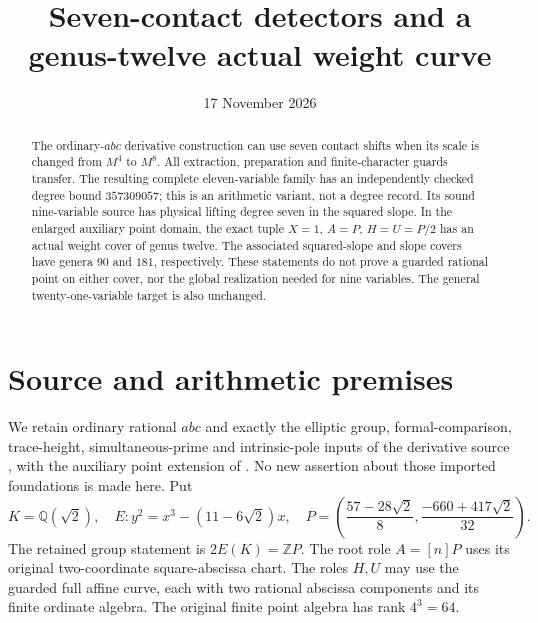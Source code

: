 \documentclass[11pt,a4paper]{article}
\title{Seven-contact detectors and a genus-twelve actual weight curve}
\author{}\date{17 November 2026}
\newcommand{\Q}{\mathbb Q}\newcommand{\Z}{\mathbb Z}
\begin{document}
\maketitle
\begin{abstract}
The ordinary-$abc$ derivative construction can use seven contact shifts
when its scale is changed from $M^4$ to $M^8$. All extraction, preparation
and finite-character guards transfer. The resulting complete eleven-variable
family has an independently checked degree bound $357309057$; this is an
arithmetic variant, not a degree record. Its sound nine-variable source has
physical lifting degree seven in the squared slope. In the enlarged auxiliary
point domain, the exact tuple $X=1$, $A=P$, $H=U=P/2$ has an actual weight
cover of genus twelve. The associated squared-slope and slope covers have
genera $90$ and $181$, respectively. These statements do not prove a guarded
rational point on either cover, nor the global realization needed for nine
variables. The general twenty-one-variable target is also unchanged.
\end{abstract}

\section{Source and arithmetic premises}
We retain ordinary rational $abc$ and exactly the elliptic group,
formal-comparison, trace-height, simultaneous-prime and intrinsic-pole
inputs of the derivative source \cite{Derivative}, with the auxiliary
point extension of \cite{FullAux}. No new assertion about those imported
foundations is made here. Put
\[
 K=\Q(\sqrt2),\quad E:y^2=x^3-(11-6\sqrt2)x,
 \quad P=\left(\frac{57-28\sqrt2}{8},\frac{-660+417\sqrt2}{32}\right).
\]
The retained group statement is $2E(K)=\Z P$. The root role $A=[n]P$
uses its original two-coordinate square-abscissa chart. The roles $H,U$
may use the guarded full affine curve, each with two rational abscissa
components and its finite ordinate algebra. The original finite point
algebra has rank $4^3=64$.
\end{document}
